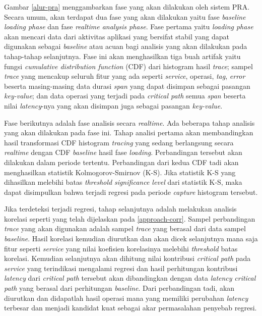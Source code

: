 Gambar \ref{alur-pra} menggambarkan fase yang akan dilakukan oleh sistem PRA. Secara umum, akan terdapat dua fase yang akan dilakukan yaitu fase \textit{baseline loading phase} dan fase \textit{realtime analysis phase}. Fase pertama yaitu \textit{loading phase} akan mencari data dari aktivitas aplikasi yang bersifat stabil yang dapat digunakan sebagai \textit{baseline} atau acuan bagi analisis yang akan dilakukan pada tahap-tahap selanjutnya. Fase ini akan menghasilkan tiga buah artifak yaitu fungsi \textit{cumulative distribution function} (CDF) dari histogram hasil \textit{trace}; sampel \textit{trace} yang mencakup seluruh fitur yang ada seperti \textit{service}, operasi, \textit{tag}, \textit{error} beserta masing-masing data durasi \textit{span} yang dapat disimpan sebagai pasangan \textit{key-value}; dan data operasi yang terjadi pada \textit{critical path} semua \textit{span} beserta nilai \textit{latency}-nya yang akan disimpan juga sebagai pasangan \textit{key-value}. 

Fase berikutnya adalah fase analisis secara \textit{realtime}. Ada beberapa tahap analisis yang akan dilakukan pada fase ini.  Tahap analisi pertama akan membandingkan hasil transformasi CDF histogram \textit{tracing} yang sedang berlangsung secara \textit{realtime} dengan CDF \textit{baseline} hasil fase \textit{loading}. Perbandingan tersebut akan dilakukan dalam periode tertentu. Perbandingan dari kedua CDF tadi akan menghasilkan statistik Kolmogorov-Smirnov (K-S). Jika statistik K-S yang dihasilkan melebihi batas \textit{threshold} \textit{significance level} dari statistik K-S, maka dapat disimpulkan bahwa terjadi regresi pada periode \textit{capture} histogram tersebut. 

Jika terdeteksi terjadi regresi, tahap selanjutnya adalah melakukan analisis korelasi seperti yang telah dijelaskan pada \ref{approach-corr}. Sampel perbandingan \textit{trace} yang akan digunakan adalah sampel \textit{trace} yang berasal dari data sampel \textit{baseline}. Hasil korelasi kemudian diurutkan dan akan dicek selanjutnya mana saja fitur seperti \textit{service} yang nilai koefisien korelasinya melebihi \textit{threshold} batas korelasi. Kemudian selanjutnya akan dihitung nilai kontribusi \textit{critical path} pada \textit{service} yang terindikasi mengalami regresi dan hasil perhitungan kontribusi \textit{latency} dari \textit{critical path} tersebut akan dibandingkan dengan data \textit{latency} \textit{critical path} yang berasal dari perhitungan \textit{baseline}. Dari perbandingan tadi, akan diurutkan dan didapatlah hasil operasi mana yang memiliki perubahan \textit{latency} terbesar dan menjadi kandidat kuat sebagai akar permasalahan penyebab regresi.


